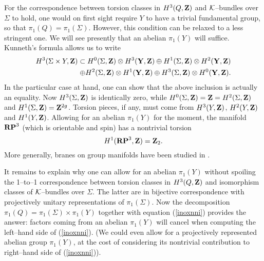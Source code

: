 \documentclass[a4paper,a4paper]{article}
\begin{document}
For the correspondence between torsion classes in $H^3(Q, {\bf Z})$
and ${\cal K}$--bundles over $\Sigma$ to hold, one would on first sight
require $Y$ to have a trivial fundamental group, so that $\pi_1(Q)=\pi_1(\Sigma)$. 
However, this condition can be relaxed to a less stringent one. 
We will see presently that an abelian $\pi_1(Y)$ will suffice.
Kunneth's formula \cite{BOTT} allows us to write
\begin{eqnarray}
H^3(\Sigma\times Y, {\bf Z}) \subset
H^0(\Sigma, {\bf Z})\otimes H^3({\bf Y}, {\bf Z}) \oplus 
H^1(\Sigma, {\bf Z})\otimes H^2({\bf Y}, {\bf Z}) \cr
\oplus
H^2(\Sigma, {\bf Z})\otimes H^1({\bf Y}, {\bf Z}) \oplus 
H^3(\Sigma, {\bf Z})\otimes H^0({\bf Y}, {\bf Z}).
\label{decomp}
\end{eqnarray}
In the particular case at hand, one can show that the above inclusion is 
actually an equality.
Now $H^3(\Sigma, {\bf Z})$ is identically zero, while
$H^0(\Sigma, {\bf Z})={\bf Z}=H^2(\Sigma, {\bf Z})$ and $H^1(\Sigma, {\bf Z})=
{\bf Z}^{2g}$. Torsion pieces, if any, must come from $H^3(Y, {\bf Z})$, 
$H^2(Y, {\bf Z})$ and $H^1(Y, {\bf Z})$. Allowing for an abelian $\pi_1(Y)$ 
for the moment, the manifold ${\bf RP}^3$ (which is orientable and spin)
has a nontrivial torsion 
\begin{equation}
H^1({\bf RP}^3, {\bf Z})={\bf Z}_2.
\label{sitors}
\end{equation}
More generally, branes on group manifolds have been studied in \cite{FS}.

It remains to explain why one can allow for an abelian $\pi_1(Y)$ without
spoiling the 1--to--1 correspondence between torsion classes in $H^3(Q, 
{\bf Z})$ and isomorphism classes of ${\cal K}$--bundles over $\Sigma$. 
The latter are in bijective correspondence with projectively unitary 
representations of $\pi_1(\Sigma)$. Now the decomposition 
$\pi_1(Q)=\pi_1(\Sigma)\times\pi_1(Y)$ together with equation 
(\ref{inoxnni}) provides the answer: factors coming from an abelian $\pi_1(Y)$
will cancel when computing the left--hand side of (\ref{inoxnni}). (We could 
even allow for a projectively represented abelian group $\pi_1(Y)$, at the 
cost of considering its nontrivial contribution to right--hand side of 
(\ref{inoxnni})).
\end{document}
